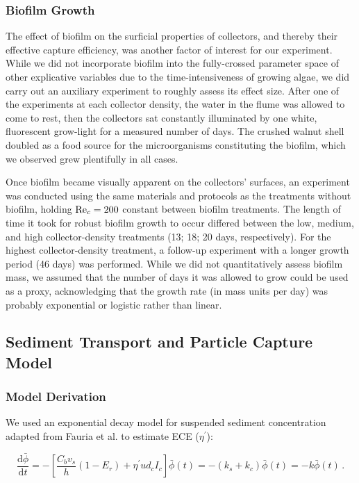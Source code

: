 \documentclass[geosciences,article,submit,moreauthors,pdftex]{Definitions/mdpi}
\begin{document}
\subsubsection{Biofilm Growth}

The effect of biofilm on the surficial properties of collectors, and thereby their effective capture efficiency, was another factor of interest for our experiment. While we did not incorporate biofilm into the fully-crossed parameter space of other explicative variables due to the time-intensiveness of growing algae, we did carry out an auxiliary experiment to roughly assess its effect size. After one of the experiments at each collector density, the water in the flume was allowed to come to rest, then the collectors sat constantly illuminated by one white, fluorescent grow-light for a measured number of days. The crushed walnut shell doubled as a food source for the microorganisms constituting the biofilm, which we observed grew plentifully in all cases.

Once biofilm became visually apparent on the collectors' surfaces, an experiment was conducted using the same materials and protocols as the treatments without biofilm, holding $\mathrm{Re}_c = 200$ constant between biofilm treatments. The length of time it took for robust biofilm growth to occur differed between the low, medium, and high collector-density treatments (13; 18; 20 days, respectively). For the highest collector-density treatment, a follow-up experiment with a longer growth period (46 days) was performed. While we did not quantitatively assess biofilm mass, we assumed that the number of days it was allowed to grow could be used as a proxy, acknowledging that the growth rate (in mass units per day) was probably exponential or logistic rather than linear.

\subsection{Sediment Transport and Particle Capture Model}

\subsubsection{Model Derivation}

We used an exponential decay model for suspended sediment concentration adapted from Fauria et al. \cite{Fauria_2015} to estimate ECE ($\eta^\prime$):

\begin{equation}
    \frac{\mathrm{d}\bar{\phi}}{\mathrm{d}t} = -\left[\frac{C_bv_s}{h}(1-E_r) + \eta^{\prime}ud_cI_c\right]\bar{\phi}(t) = -(k_s + k_c)\bar{\phi}(t) = -k\bar{\phi}(t)\,.
    \label{eq:model}    
\end{equation}
\end{document}
